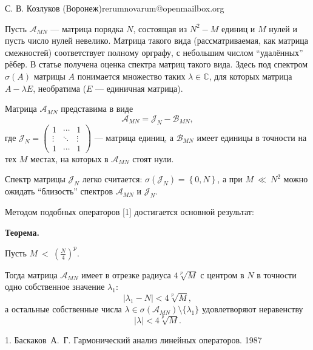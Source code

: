 \documentclass[a4paper]{article}
\begin{document}
{С. В. Козлуков}
{}{ (Воронеж)}{rerumnovarum@openmailbox.org}

Пусть \( \mathcal{A}_{MN} \) --- матрица порядка \( N \),
состоящая из \( N^2 - M \) единиц и \( M \) нулей
и пусть число нулей невелико.
Матрица такого вида (рассматриваемая, как матрица смежностей) соответствует
полному орграфу, с небольшим числом ``удалённых'' рёбер.
В статье получена оценка спектра
матриц такого вида.
Здесь под спектром \( \sigma\left({A}\right) \) матрицы \( A \)
понимается множество таких \( \lambda\in\mathbb{C} \), для которых
матрица \( A - \lambda E \), необратима (\( E \) --- единичная матрица).

Матрица \( \mathcal{A}_{MN} \) представима в виде
\[
    \mathcal{A}_{MN} = \mathcal{J}_{N} - \mathcal{B}_{MN},
    \]
где \(
\mathcal{J}_{N} =
\begin{pmatrix}1 & \cdots & 1 \\
\vdots & \ddots & \vdots \\
1 & \cdots & 1
\end{pmatrix} \) --- матрица единиц,
а \( \mathcal{B}_{MN} \) имеет единицы в точности на тех \( M \)
местах, на которых в \( \mathcal{A}_{MN} \) стоят нули.

Спектр матрицы \( \mathcal{J}_{N} \) легко считается:
\( \sigma\left({\mathcal{J}_{N}}\right) = \left\{0, N \right\} \),
а при \( M~\ll~N^2 \) можно ожидать ``близость'' спектров
\( \mathcal{A}_{MN} \) и \( \mathcal{J}_{N} \).

Методом подобных операторов [1]
достигается основной результат:

\textbf{Теорема.}
\begin{center}\relax
    Пусть
    \(M~<~\displaystyle{\left(\frac{N}{4}\right)^p}. \)

Тогда матрица \( \mathcal{A}_{MN} \) имеет в отрезке
    радиуса \( 4\sqrt[p]{M} \) с центром в \( N \)
    в точности одно собственное значение \( \lambda_1 \):
    \[ \lvert \lambda_1 - N \rvert < 4\sqrt[p]{M}, \]
    а остальные собственные числа
    \( \lambda\in\sigma\left({\mathcal{A}_{MN}}\right)\setminus\{\lambda_1\} \)
    удовлетворяют неравенству
    \[ \lvert \lambda \rvert < 4\sqrt[p]{M}. \]
\end{center}

\liter

1. Баскаков~А.~Г. Гармонический анализ линейных операторов. 1987
\end{document}
